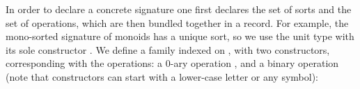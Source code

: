 In order to declare a concrete signature one first declares the set of
sorts and the set of operations, which are then bundled together in a
record.  For example, the mono-sorted signature of monoids has a
unique sort, so we use the unit type  with its sole
constructor . We define a family indexed
on
\AgdaSpace{}\AgdaSpace{}\AgdaSpace{},
with two constructors, corresponding with the operations: a 0-ary
operation , and a binary operation
 (note that constructors can start with a
lower-case letter or any symbol):

\label{sec:ua-ex-monoid}
\begin{code}
\>[0]\AgdaSpace{}%
\AgdaSpace{}%
\AgdaSymbol{:}\AgdaSpace{}%
\AgdaSpace{}%
\AgdaSpace{}%
\AgdaSpace{}%
\AgdaSpace{}%
\AgdaSpace{}%
\AgdaSpace{}%
\<%
\\
\>[0][@{}l@{\AgdaIndent{0}}]%
\>[3]\AgdaSpace{}%
\AgdaSymbol{:}\AgdaSpace{}%
\AgdaSpace{}%
\AgdaSymbol{(}\AgdaInductiveConstructor{[]}\AgdaSpace{}%
\AgdaOperator{\AgdaInductiveConstructor{,}}\AgdaSpace{}%
\AgdaSymbol{)}\<%
\\
%
\>[3]\AgdaSpace{}%
\AgdaSymbol{:}\AgdaSpace{}%
\AgdaSpace{}%
\AgdaSymbol{(}\AgdaSpace{}%
\AgdaSpace{}%
\AgdaOperator{\AgdaFunction{[}}\AgdaSpace{}%
\AgdaSpace{}%
\AgdaOperator{\AgdaFunction{]}}\AgdaSpace{}%
\AgdaOperator{\AgdaInductiveConstructor{,}}\AgdaSpace{}%
\AgdaSymbol{)}\<%
\\
\\
\>[0]\AgdaSpace{}%
\AgdaSymbol{:}\AgdaSpace{}%
\<%
\\
\>[0]\AgdaSpace{}%
\AgdaSymbol{=}\AgdaSpace{}%
\AgdaSpace{}%
\AgdaSymbol{\{}\AgdaSpace{}%
\AgdaSpace{}%
\AgdaSymbol{=}\AgdaSpace{}%
\AgdaSpace{}%
\AgdaSymbol{;}\AgdaSpace{}%
\AgdaSpace{}%
\AgdaSymbol{=}\AgdaSpace{}%
\AgdaSpace{}%
\AgdaSymbol{\}}\<%
\end{code}

